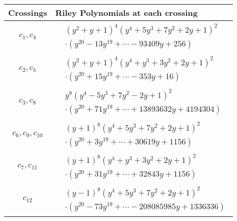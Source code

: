 \documentclass[1p]{elsarticle_modified}
\theoremstyle{definition}
\begin{document}
\begin{tabular}{m{50pt}|m{274pt}}
Crossings & \hspace{64pt}Riley Polynomials at each crossing \\
\hline $$\begin{aligned}c_{1},c_{4}\end{aligned}$$&$\begin{aligned}
&(y^2+y+1)^4(y^4+5 y^3+7 y^2+2 y+1)^2\\
&\cdot(y^{20}-13 y^{19}+\cdots-93409 y+256)
\end{aligned}$\\
\hline $$\begin{aligned}c_{2},c_{5}\end{aligned}$$&$\begin{aligned}
&(y^2+y+1)^4(y^4+y^3+3 y^2+2 y+1)^2\\
&\cdot(y^{20}+15 y^{19}+\cdots-353 y+16)
\end{aligned}$\\
\hline $$\begin{aligned}c_{3},c_{8}\end{aligned}$$&$\begin{aligned}
&y^8(y^4-5 y^3+7 y^2-2 y+1)^2\\
&\cdot(y^{20}+71 y^{19}+\cdots+13893632 y+4194304)
\end{aligned}$\\
\hline $$\begin{aligned}c_{6},c_{9},c_{10}\end{aligned}$$&$\begin{aligned}
&(y+1)^8(y^4+5 y^3+7 y^2+2 y+1)^2\\
&\cdot(y^{20}+3 y^{19}+\cdots+30619 y+1156)
\end{aligned}$\\
\hline $$\begin{aligned}c_{7},c_{11}\end{aligned}$$&$\begin{aligned}
&(y+1)^8(y^4+y^3+3 y^2+2 y+1)^2\\
&\cdot(y^{20}+31 y^{19}+\cdots+32843 y+1156)
\end{aligned}$\\
\hline $$\begin{aligned}c_{12}\end{aligned}$$&$\begin{aligned}
&(y-1)^8(y^4+5 y^3+7 y^2+2 y+1)^2\\
&\cdot(y^{20}-73 y^{19}+\cdots-208085985 y+1336336)
\end{aligned}$\\
\hline
\end{tabular}
\vskip 2pc
\end{document}
